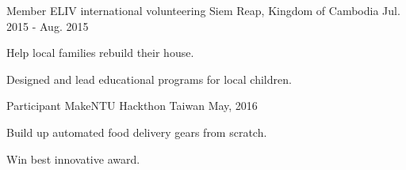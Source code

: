 \begin{cventries}
  \cventry
    {Member}
    {ELIV international volunteering}
    {Siem Reap, Kingdom of Cambodia}
    {Jul. 2015 - Aug. 2015 }
    {
      \begin{cvitems}
        \item {Help local families rebuild their house.}
        \item {Designed and lead educational programs for local children.}
      \end{cvitems}
    }
    
    \cventry
    {Participant}
    {MakeNTU Hackthon}
    {Taiwan}
    {May, 2016}
    {
      \begin{cvitems}
        \item {Build up automated food delivery gears from scratch.}
        \item {Win best innovative award.}
      \end{cvitems}
    }
    

\end{cventries}
